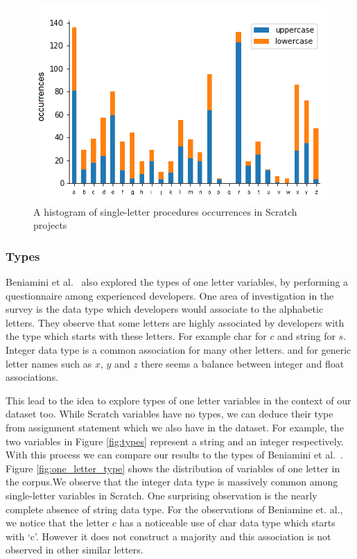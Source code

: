 \documentclass[conference]{IEEEtran}
\begin{document}
\begin{figure}[h]
	\begin{center}
		\includegraphics[width=\columnwidth]{fig/funcname_singleletter-occurrences}
		\caption{A histogram of single-letter procedures occurrences in Scratch projects}
		\label{fig:one_letter_occurrence_procedures}
	\end{center}
\end{figure} 

\subsubsection{Types}
\label{res:types}
Beniamini et al.~\cite{Beniamini} also explored the types of one letter variables, by performing a questionnaire among experienced developers. One area of investigation in the survey is the data type which developers would associate to the alphabetic letters. They observe that some letters are highly associated by developers with the type which starts with these letters. For example char for $c$ and string for $s$. Integer data type is a common association for many other letters. and for generic letter names such as $x$, $y$ and $z$ there seems a balance between integer and float associations. 

This lead to the idea to explore types of one letter variables in the context of our dataset too. While Scratch variables have no types, we can deduce their type from assignment statement which we also have in the dataset. For example, the two variables in Figure \ref{fig:types} represent a string and an integer respectively. With this process we can compare our results to the types of Beniamini et al.~\cite{Beniamini}. 
Figure \ref{fig:one_letter_type} shows the distribution of variables of one letter in the corpus.We observe that the integer data type is massively common among single-letter variables in Scratch. One surprising observation is the nearly complete absence of string data type. For the observations of Beniamine et. al., we notice that the letter $c$ has a noticeable use of char data type which starts with `c'. However it does not construct a majority and this association is not observed in other similar letters. 
\end{document}
